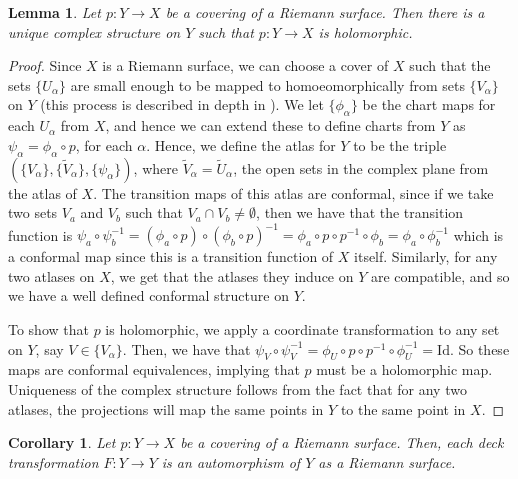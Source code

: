 \documentclass[11pt]{report}
\newtheorem{lemma}[thm]{Lemma}
\newtheorem{cor}[thm]{Corollary}
\theoremstyle{definition}
\begin{document}
\begin{lemma}
  Let $p:Y \rightarrow X$ be a covering of a Riemann surface. Then there is a unique complex structure on $Y$ such that $p:Y \rightarrow X$ is holomorphic.
\end{lemma}
\begin{proof}
  Since $X$ is a Riemann surface, we can choose a cover of $X$ such that the sets $\{U_{\alpha}\}$ are small enough to be mapped to homoeomorphically from sets $\{V_{\alpha}\}$ on $Y$ (this process is described in depth in \cite[Theorem 4.11.2]{comfun}). We let $\{\phi_{\alpha}\}$ be the chart maps for each $U_{\alpha}$ from $X$, and hence we can extend these to define charts from $Y$ as $\psi_{\alpha} = \phi_{\alpha} \circ p$, for each $\alpha$. Hence, we define the atlas for $Y$ to be the triple $(\{V_{\alpha}\},\{\widetilde{V}_{\alpha}\},\{\psi_{\alpha}\})$, where $\widetilde{V}_{\alpha} = \widetilde{U}_{\alpha}$, the open sets in the complex plane from the atlas of $X$. The transition maps of this atlas are conformal, since if we take two sets $V_a$ and $V_b$ such that $V_a \cap V_b \neq \emptyset$, then we have that the transition function is $\psi_{a}\circ\psi_{b}^{-1} = (\phi_{a}\circ p)\circ (\phi_{b} \circ p)^{-1} = \phi_{a}\circ p \circ p^{-1}\circ \phi_{b}=\phi_{a}\circ\phi_b^{-1}$ which is a conformal map since this is a transition function of $X$ itself. Similarly, for any two atlases on $X$, we get that the atlases they induce on $Y$ are compatible, and so we have a well defined conformal structure on $Y$. 

  To show that $p$ is holomorphic, we apply a coordinate transformation to any set on $Y$, say $V\in \{V_{\alpha}\}$. Then, we have that $\psi_{V} \circ \psi_{V}^{-1} = \phi_{U}\circ p\circ p^{-1}\circ \phi_{U}^{-1} = \text{Id}$. So these maps are conformal equivalences, implying that $p$ must be a holomorphic map. Uniqueness of the complex structure follows from the fact that for any two atlases, the projections will map the same points in $Y$ to the same point in $X$.
\end{proof}
\begin{cor}
  Let $p:Y \rightarrow X$ be a covering of a Riemann surface. Then, each deck  transformation $F:Y \rightarrow Y$ is an automorphism of $Y$ as a Riemann surface.
\end{cor}
\end{document}
